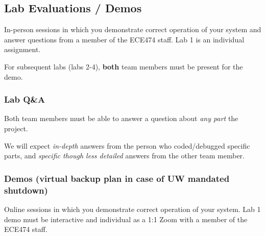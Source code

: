 
\subsection{Lab Evaluations / Demos}


In-person sessions in which you demonstrate correct operation
of your system and answer questions from a member of the ECE474 staff.  
Lab 1 is an individual assignment.    

For subsequent labs (labs 2-4), {\bf both} team members must be present for 
the demo.    



\subsubsection{Lab Q\&A}  Both team
members must be able to answer a question about  {\it any part }
    the project.  
    
We will expect {\it in-depth} answers from the 
    person who coded/debugged specific parts, 
    and {\it specific though less detailed} answers
    from the other team member.

    
\subsubsection{Demos (virtual backup plan in case of UW mandated shutdown)}

Online sessions in which you demonstrate correct operation
of your system.  Lab 1 demo must be interactive and individual as
a 1:1 Zoom with a member of the ECE474 staff.   

